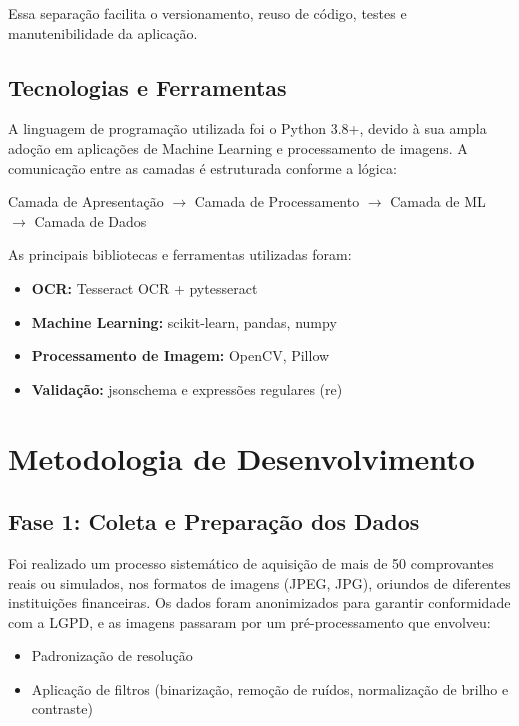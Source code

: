 Essa separação facilita o versionamento, reuso de código, testes e manutenibilidade da aplicação.

\subsection{Tecnologias e Ferramentas}

A linguagem de programação utilizada foi o Python 3.8+, devido à sua ampla adoção em aplicações de Machine Learning e processamento de imagens. A comunicação entre as camadas é estruturada conforme a lógica:

\begin{center}
Camada de Apresentação $\rightarrow$ Camada de Processamento $\rightarrow$ Camada de ML $\rightarrow$ Camada de Dados
\end{center}

As principais bibliotecas e ferramentas utilizadas foram:

\begin{itemize}
    \item \textbf{OCR:} Tesseract OCR + pytesseract
    \item \textbf{Machine Learning:} scikit-learn, pandas, numpy
    \item \textbf{Processamento de Imagem:} OpenCV, Pillow
    \item \textbf{Validação:} jsonschema e expressões regulares (re)
\end{itemize}

\section{Metodologia de Desenvolvimento}

\subsection{Fase 1: Coleta e Preparação dos Dados}

Foi realizado um processo sistemático de aquisição de mais de 50 comprovantes reais ou simulados, nos formatos de imagens (JPEG, JPG), oriundos de diferentes instituições financeiras. Os dados foram anonimizados para garantir conformidade com a LGPD, e as imagens passaram por um pré-processamento que envolveu:

\begin{itemize}
    
    \item Padronização de resolução
    \item Aplicação de filtros (binarização, remoção de ruídos, normalização de brilho e contraste)
\end{itemize}

